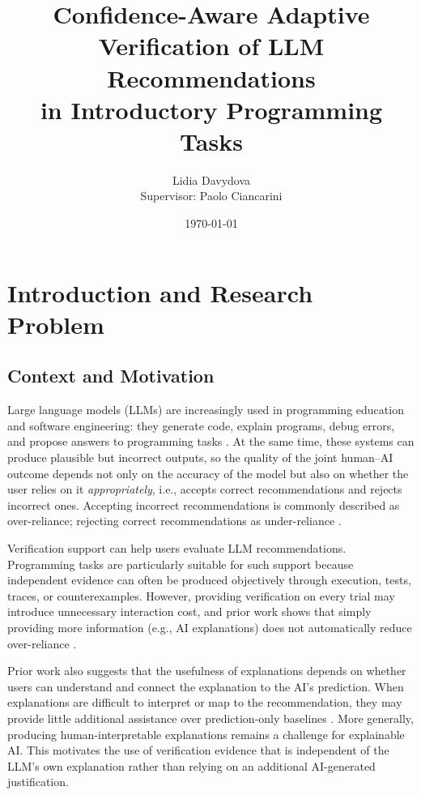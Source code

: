 \documentclass[oneside,final,14pt,a4paper]{extreport}
\title{Confidence-Aware Adaptive Verification of LLM Recommendations\\
in Introductory Programming Tasks}
\author{Lidia Davydova\\[1mm]Supervisor: Paolo Ciancarini}   %
\date{\today}
\theoremstyle{definition}
\theoremstyle{remark}
\begin{document}
\maketitle

\section{Introduction and Research Problem}

\subsection{Context and Motivation}
Large language models (LLMs) are increasingly used in programming education and
software engineering: they generate code, explain programs, debug errors, and
propose answers to programming tasks \cite{Ma2023,Cambaz2024}. At the same
time, these systems can produce plausible but incorrect outputs, so the quality
of the joint human--AI outcome depends not only on the accuracy of the model
but also on whether the user relies on it \emph{appropriately}, i.e., accepts
correct recommendations and rejects incorrect ones. Accepting incorrect
recommendations is commonly described as over-reliance; rejecting correct
recommendations as under-reliance \cite{PoursabziSangdeh2021,Vasconcelos2023}.

Verification support can help users evaluate LLM recommendations. Programming
tasks are particularly suitable for such support because independent evidence
can often be produced objectively through execution, tests, traces, or
counterexamples. However, providing verification on every trial may introduce
unnecessary interaction cost, and prior work shows that simply providing more
information (e.g., AI explanations) does not automatically reduce over-reliance
\cite{Bucinca2021,Vasconcelos2023}.

Prior work also suggests that the usefulness of explanations depends on whether
users can understand and connect the explanation to the AI's prediction. When
explanations are difficult to interpret or map to the recommendation, they may
provide little additional assistance over prediction-only baselines
\cite{ma2024arereallysureunderstanding}. More generally, producing human-interpretable explanations remains a challenge for explainable AI. This motivates the use of verification evidence
that is independent of the LLM's own explanation rather than relying on an
additional AI-generated justification.
\end{document}
